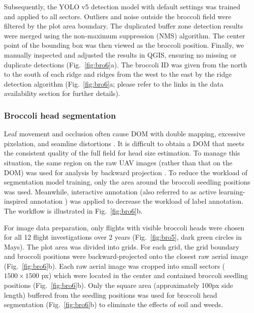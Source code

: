 Subsequently, the YOLO v5 detection model with default settings was trained and applied to all sectors. Outliers and noise outside the broccoli field were filtered by the plot area boundary. The duplicated buffer zone detection results were merged using the non-maximum suppression (NMS) algorithm. The center point of the bounding box was then viewed as the broccoli position. Finally, we manually inspected and adjusted the results in QGIS, ensuring no missing or duplicate detections (Fig.~\ref{fig:bro6}a). The broccoli ID was given from the north to the south of each ridge and ridges from the west to the east by the ridge detection algorithm (Fig.~\ref{fig:bro6}a; please refer to the links in the data availability section for further details). 

\subsubsection*{Broccoli head segmentation}

Leaf movement and occlusion often cause DOM with double mapping, excessive pixelation, and seamline distortions \citep{lin_new_2021}. It is difficult to obtain a DOM that meets the consistent quality of the full field for head size estimation. To manage this situation, the same region on the raw UAV images (rather than that on the DOM) was used for analysis by backward projection \citep{wang_easyidp_2021}. To reduce the workload of segmentation model training, only the area around the broccoli seedling positions was used. Meanwhile, interactive annotation (also referred to as active learning-inspired annotation \citep{ghosal_weakly_2019}) was applied to decrease the workload of label annotation. The workflow is illustrated in Fig.~\ref{fig:bro6}b.

For image data preparation, only flights with visible broccoli heads were chosen for all 12 flight investigations over 2 years (Fig.~\ref{fig:bro5}, dark green circles in Mays). The plot area was divided into grids. For each grid, the grid boundary and broccoli positions were backward-projected onto the closest raw aerial image (Fig.~\ref{fig:bro6}b). Each raw aerial image was cropped into small sectors ($1500 \times 1500$ px) which were located in the center and contained broccoli seedling positions (Fig.~\ref{fig:bro6}b). Only the square area (approximately 100px side length) buffered from the seedling positions was used for broccoli head segmentation (Fig.~\ref{fig:bro6}b) to eliminate the effects of soil and weeds.


